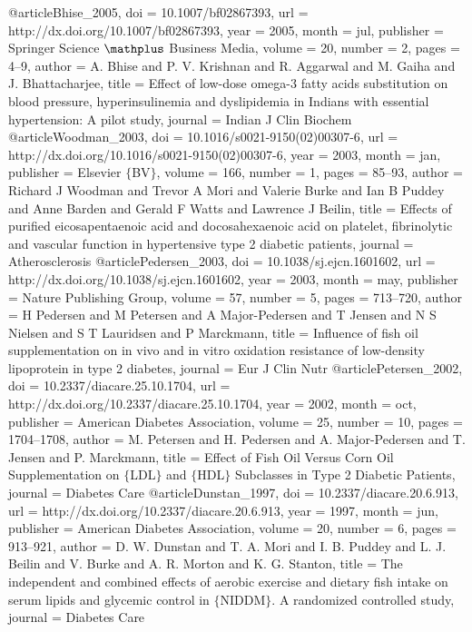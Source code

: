 @article{Bhise_2005,
	doi = {10.1007/bf02867393},
	url = {http://dx.doi.org/10.1007/bf02867393},
	year = 2005,
	month = {jul},
	publisher = {Springer Science $\mathplus$ Business Media},
	volume = {20},
	number = {2},
	pages = {4--9},
	author = {A. Bhise and P. V. Krishnan and R. Aggarwal and M. Gaiha and J. Bhattacharjee},
	title = {Effect of low-dose omega-3 fatty acids substitution on blood pressure, hyperinsulinemia and dyslipidemia in Indians with essential hypertension: A pilot study},
	journal = {Indian J Clin Biochem}
}
@article{Woodman_2003,
	doi = {10.1016/s0021-9150(02)00307-6},
	url = {http://dx.doi.org/10.1016/s0021-9150(02)00307-6},
	year = 2003,
	month = {jan},
	publisher = {Elsevier $\lbrace$BV$\rbrace$},
	volume = {166},
	number = {1},
	pages = {85--93},
	author = {Richard J Woodman and Trevor A Mori and Valerie Burke and Ian B Puddey and Anne Barden and Gerald F Watts and Lawrence J Beilin},
	title = {Effects of purified eicosapentaenoic acid and docosahexaenoic acid on platelet, fibrinolytic and vascular function in hypertensive type 2 diabetic patients},
	journal = {Atherosclerosis}
}
@article{Pedersen_2003,
	doi = {10.1038/sj.ejcn.1601602},
	url = {http://dx.doi.org/10.1038/sj.ejcn.1601602},
	year = 2003,
	month = {may},
	publisher = {Nature Publishing Group},
	volume = {57},
	number = {5},
	pages = {713--720},
	author = {H Pedersen and M Petersen and A Major-Pedersen and T Jensen and N S Nielsen and S T Lauridsen and P Marckmann},
	title = {Influence of fish oil supplementation on in vivo and in vitro oxidation resistance of low-density lipoprotein in type 2 diabetes},
	journal = {Eur J Clin Nutr}
}
@article{Petersen_2002,
	doi = {10.2337/diacare.25.10.1704},
	url = {http://dx.doi.org/10.2337/diacare.25.10.1704},
	year = 2002,
	month = {oct},
	publisher = {American Diabetes Association},
	volume = {25},
	number = {10},
	pages = {1704--1708},
	author = {M. Petersen and H. Pedersen and A. Major-Pedersen and T. Jensen and P. Marckmann},
	title = {Effect of Fish Oil Versus Corn Oil Supplementation on $\lbrace$LDL$\rbrace$ and $\lbrace$HDL$\rbrace$ Subclasses in Type 2 Diabetic Patients},
	journal = {Diabetes Care}
}
@article{Dunstan_1997,
	doi = {10.2337/diacare.20.6.913},
	url = {http://dx.doi.org/10.2337/diacare.20.6.913},
	year = 1997,
	month = {jun},
	publisher = {American Diabetes Association},
	volume = {20},
	number = {6},
	pages = {913--921},
	author = {D. W. Dunstan and T. A. Mori and I. B. Puddey and L. J. Beilin and V. Burke and A. R. Morton and K. G. Stanton},
	title = {The independent and combined effects of aerobic exercise and dietary fish intake on serum lipids and glycemic control in $\lbrace$NIDDM$\rbrace$. A randomized controlled study},
	journal = {Diabetes Care}
}
